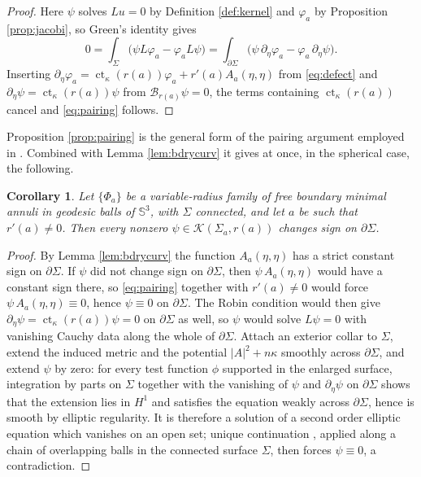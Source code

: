 \documentclass[11pt,a4paper]{amsart}
\theoremstyle{plain}
\newtheorem{corollary}[theorem]{Corollary}
\theoremstyle{definition}
\newcommand{\Sph}{\mathbb{S}}
\newcommand{\ct}{\operatorname{ct}_\kappa}
\newcommand{\Ker}{\mathcal{K}}
\begin{document}
\begin{proof}
Here $\psi$ solves $Lu=0$ by Definition \ref{def:kernel} and $\varphi_a$ by Proposition \ref{prop:jacobi}, so Green's identity gives
\[
0=\int_\Sigma\bigl(\psi L\varphi_a-\varphi_a L\psi\bigr)=\int_{\partial\Sigma}\bigl(\psi\,\partial_\eta\varphi_a-\varphi_a\,\partial_\eta\psi\bigr).
\]
Inserting $\partial_\eta\varphi_a=\ct(r(a))\varphi_a+r'(a)A_a(\eta,\eta)$ from \eqref{eq:defect} and $\partial_\eta\psi=\ct(r(a))\psi$ from $\mathcal{B}_{r(a)}\psi=0$, the terms containing $\ct(r(a))$ cancel and \eqref{eq:pairing} follows.
\end{proof}

Proposition \ref{prop:pairing} is the general form of the pairing argument employed in \cite{P1}. Combined with Lemma \ref{lem:bdrycurv} it gives at once, in the spherical case, the following.

\begin{corollary}\label{cor:signchange}
Let $\{\Phi_a\}$ be a variable-radius family of free boundary minimal annuli in geodesic balls of $\Sph^3$, with $\Sigma$ connected, and let $a$ be such that $r'(a)\neq 0$. Then every nonzero $\psi\in\Ker(\Sigma_a,r(a))$ changes sign on $\partial\Sigma$.
\end{corollary}

\begin{proof}
By Lemma \ref{lem:bdrycurv} the function $A_a(\eta,\eta)$ has a strict constant sign on $\partial\Sigma$. If $\psi$ did not change sign on $\partial\Sigma$, then $\psi\,A_a(\eta,\eta)$ would have a constant sign there, so \eqref{eq:pairing} together with $r'(a)\neq 0$ would force $\psi\,A_a(\eta,\eta)\equiv 0$, hence $\psi\equiv 0$ on $\partial\Sigma$. The Robin condition would then give $\partial_\eta\psi=\ct(r(a))\psi=0$ on $\partial\Sigma$ as well, so $\psi$ would solve $L\psi=0$ with vanishing Cauchy data along the whole of $\partial\Sigma$. Attach an exterior collar to $\Sigma$, extend the induced metric and the potential $|A|^2+n\kappa$ smoothly across $\partial\Sigma$, and extend $\psi$ by zero: for every test function $\phi$ supported in the enlarged surface, integration by parts on $\Sigma$ together with the vanishing of $\psi$ and $\partial_\eta\psi$ on $\partial\Sigma$ shows that the extension lies in $H^1$ and satisfies the equation weakly across $\partial\Sigma$, hence is smooth by elliptic regularity. It is therefore a solution of a second order elliptic equation which vanishes on an open set; unique continuation \cite{Aro57}, applied along a chain of overlapping balls in the connected surface $\Sigma$, then forces $\psi\equiv 0$, a contradiction.
\end{proof}
\end{document}
